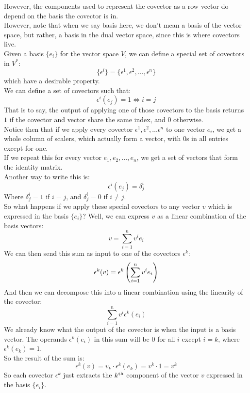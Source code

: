 \documentclass[12pt]{article}
\begin{document}
However, the components used to represent the
covector as a row vector do depend on the
basis the covector is in. \\

However, note that when we say basis here,
we don't mean a basis of the vector space,
but rather, a basis in the dual vector space,
since this is where covectors live. \\

Given a basis $\{ e_i \}$ for the vector space $V$,
we can define a special set of covectors in $V^*$:
\[ \{ \epsilon^i \} = 
\{ \epsilon^1, \epsilon^2, \dots, \epsilon^n \} \]
which have a desirable property. \\
We can define a set of covectors such that:
\[ \epsilon^i(e_j) = 1 \iff i = j \]
That is to say, the output of applying
one of those covectors to the basis returns
$1$ if the covector
and vector share the same index,
and $0$ otherwise. \\
Notice then that if we apply every covector
$\epsilon^1, \epsilon^2, \dots \epsilon^n$
to one vector $e_i$,
we get a whole column of scalers,
which actually form a vector,
with $0$s in all entries except for one. \\
If we repeat this for every vector
$e_1, e_2, \dots, e_n$,
we get a set of vectors that form the
identity matrix. \\
Another way to write this is:
\[ \epsilon^i(e_j) = \delta_j^i \]
Where $\delta_j^i = 1$ if $i = j$,
and $\delta_j^i = 0$ if $i \neq j$. \\

So what happens if we apply these special
covectors to any vector $v$
which is expressed in the basis $\{e_i\}$?
Well, we can express $v$
as a linear combination of the basis vectors:
\[ v = \sum_{i = 1}^{n} v^ie_i \]
We can then send this sum
as input to one of the covectors $\epsilon^k$:
\[ \epsilon^k(v)
= \epsilon^k\left( \sum_{i = 1}^{n} v^ie_i \right) \]
And then we can decompose this into
a linear combination using the linearity of
the covector:
\[ \sum_{i = 1}^{n} v^i\epsilon^k(e_i)  \]
We already know what the output of the covector
is when the input is a basis vector.
The operands $\epsilon^k(e_i)$
in this sum will be $0$ for all $i$
except $i = k$,
where $\epsilon^k(e_k) = 1$. \\
So the result of the sum is:
\[ \epsilon^k(v) = v_k \cdot \epsilon^k(e_k)
= v^k \cdot 1 = v^k \]
So each covector $\epsilon^k$
just extracts the $k^{\text{th}}$ component
of the vector $v$ expressed in the
basis $\{ e_i \}$. \\
\end{document}
